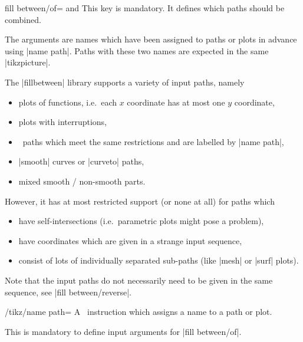 \begin{tikzkey}{fill between/of= and }
	This key is mandatory. It defines which paths should be combined.

	The arguments are names which have been assigned to paths or plots in advance using |name path|. Paths with these two names are expected in the same |tikzpicture|.

	The |fillbetween| library supports a variety of input paths, namely
	\begin{itemize}
		\item plots of functions, i.e.\ each $x$ coordinate has at most one $y$ coordinate,
		\item plots with interruptions,
		\item \Tikz\ paths which meet the same restrictions and are labelled by |name path|,
		\item |smooth| curves or |curveto| paths,
		\item mixed smooth / non-smooth parts.
	\end{itemize}
	However, it has at most restricted support (or none at all) for paths which
	\begin{itemize}
		\item have self-intersections (i.e.\ parametric plots might pose a problem),
		\item have coordinates which are given in a strange input sequence,
		\item consist of lots of individually separated sub-paths (like |mesh| or |surf| plots).
	\end{itemize}

	Note that the input paths do not necessarily need to be given in the same sequence, see |fill between/reverse|.
\end{tikzkey}

\begin{key}{/tikz/name path=}
	A \Tikz\ instruction which assigns a name to a path or plot.

	This is mandatory to define input arguments for |fill between/of|.
\end{key}

